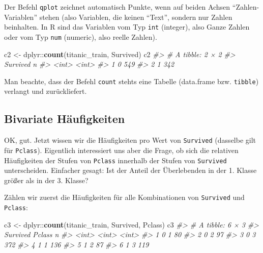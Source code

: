 \documentclass[12pt,ngerman,]{book}
\newenvironment{Shaded}{\begin{snugshade}}{\end{snugshade}}
\newcommand{\KeywordTok}[1]{\textcolor[rgb]{0.13,0.29,0.53}{\textbf{{#1}}}}
\newcommand{\StringTok}[1]{\textcolor[rgb]{0.31,0.60,0.02}{{#1}}}
\newcommand{\CommentTok}[1]{\textcolor[rgb]{0.56,0.35,0.01}{\textit{{#1}}}}
\newcommand{\NormalTok}[1]{{#1}}
\renewenvironment{Shaded}{\begin{kframe}}{\end{kframe}}
\begin{document}
Der Befehl \texttt{qplot} zeichnet automatisch Punkte, wenn auf beiden
Achsen ``Zahlen-Variablen'' stehen (also Variablen, die keinen ``Text'',
sondern nur Zahlen beinhalten. In R sind das Variablen vom Typ
\texttt{int} (integer), also Ganze Zahlen oder vom Typ \texttt{num}
(numeric), also reelle Zahlen).

\begin{Shaded}
\begin{Highlighting}[]

\NormalTok{c2 <-}\StringTok{ }\NormalTok{dplyr::}\KeywordTok{count}\NormalTok{(titanic_train, Survived)}
\NormalTok{c2}
\CommentTok{#> # A tibble: 2 × 2}
\CommentTok{#>   Survived     n}
\CommentTok{#>      <int> <int>}
\CommentTok{#> 1        0   549}
\CommentTok{#> 2        1   342}
\end{Highlighting}
\end{Shaded}

Man beachte, dass der Befehl \texttt{count} stehts eine Tabelle
(data.frame bzw. \texttt{tibble}) verlangt und zurückliefert.

\subsection{Bivariate Häufigkeiten}\label{bivariate-haufigkeiten}

OK, gut. Jetzt wissen wir die Häufigkeiten pro Wert von
\texttt{Survived} (dasselbe gilt für \texttt{Pclass}). Eigentlich
interessiert uns aber die Frage, ob sich die relativen Häufigkeiten der
Stufen von \texttt{Pclass} innerhalb der Stufen von \texttt{Survived}
unterscheiden. Einfacher gesagt: Ist der Anteil der Überlebenden in der
1. Klasse größer als in der 3. Klasse?

Zählen wir zuerst die Häufigkeiten für alle Kombinationen von
\texttt{Survived} und \texttt{Pclass}:

\begin{Shaded}
\begin{Highlighting}[]
\NormalTok{c3 <-}\StringTok{ }\NormalTok{dplyr::}\KeywordTok{count}\NormalTok{(titanic_train, Survived, Pclass)}
\NormalTok{c3}
\CommentTok{#> # A tibble: 6 × 3}
\CommentTok{#>   Survived Pclass     n}
\CommentTok{#>      <int>  <int> <int>}
\CommentTok{#> 1        0      1    80}
\CommentTok{#> 2        0      2    97}
\CommentTok{#> 3        0      3   372}
\CommentTok{#> 4        1      1   136}
\CommentTok{#> 5        1      2    87}
\CommentTok{#> 6        1      3   119}
\end{Highlighting}
\end{Shaded}
\end{document}
